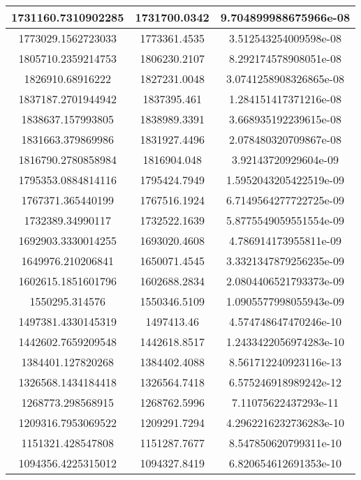 \begin{longtable}[!h]{|c|c|c|}
    \hline
    1731160.7310902285 & 1731700.0342 & 9.704899988675966e-08\\
    \hline
    1773029.1562723033 & 1773361.4535 & 3.512543254009598e-08\\
    \hline
    1805710.2359214753 & 1806230.2107 & 8.292174578908051e-08\\
    \hline
    1826910.68916222 & 1827231.0048 & 3.0741258908326865e-08\\
    \hline
    1837187.2701944942 & 1837395.461 & 1.284151417371216e-08\\
    \hline
    1838637.157993805 & 1838989.3391 & 3.668935192239615e-08\\
    \hline
    1831663.379869986 & 1831927.4496 & 2.078480320709867e-08\\
    \hline
    1816790.2780858984 & 1816904.048 & 3.92143720929604e-09\\
    \hline
    1795353.0884814116 & 1795424.7949 & 1.5952043205422519e-09\\
    \hline
    1767371.365440199 & 1767516.1924 & 6.7149564277722725e-09\\
    \hline
    1732389.34990117 & 1732522.1639 & 5.8775549059551554e-09\\
    \hline
    1692903.3330014255 & 1693020.4608 & 4.786914173955811e-09\\
    \hline
    1649976.210206841 & 1650071.4545 & 3.3321347879256235e-09\\
    \hline
    1602615.1851601796 & 1602688.2834 & 2.0804406521793373e-09\\
    \hline
    1550295.314576 & 1550346.5109 & 1.0905577998055943e-09\\
    \hline
    1497381.4330145319 & 1497413.46 & 4.574748647470246e-10\\
    \hline
    1442602.7659209548 & 1442618.8517 & 1.2433422056974283e-10\\
    \hline
    1384401.127820268 & 1384402.4088 & 8.561712240923116e-13\\
    \hline
    1326568.1434184418 & 1326564.7418 & 6.575246918989242e-12\\
    \hline
    1268773.298568915 & 1268762.5996 & 7.11075622437293e-11\\
    \hline
    1209316.7953069522 & 1209291.7294 & 4.2962216232736283e-10\\
    \hline
    1151321.428547808 & 1151287.7677 & 8.547850620799311e-10\\
    \hline
    1094356.4225315012 & 1094327.8419 & 6.820654612691353e-10\\

\end{longtable}
